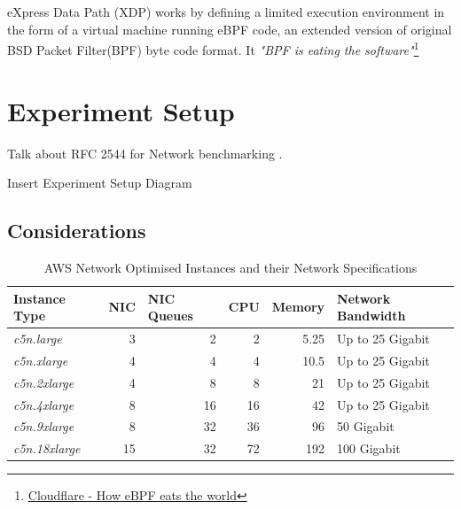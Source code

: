 \documentclass[12pt,titlepage]{article}
\begin{document}
eXpress Data Path (XDP) works by defining a limited execution environment in the form of a virtual machine running eBPF code, an extended version of original BSD Packet Filter(BPF) \cite{mccanne_bsd_1993} byte code format.  
It \textit{"BPF is eating the software"}\footnote{\href{https://blog.cloudflare.com/cloudflare-architecture-and-how-bpf-eats-the-world/}{Cloudflare - How eBPF eats the world}} 


\section{Experiment Setup}

Talk about  RFC 2544 \cite{rfc2544} for Network benchmarking .

Insert Experiment Setup Diagram 

\subsection{Considerations}


\begin{table}[]
\begin{tabular}{|l|r|r|r|r|l|}
\hline
\textbf{Instance Type} & \multicolumn{1}{l|}{\textbf{NIC}} & \multicolumn{1}{l|}{\textbf{NIC Queues}} & \multicolumn{1}{l|}{\textbf{CPU}} & \multicolumn{1}{l|}{\textbf{Memory}} & \textbf{Network Bandwidth} \\ \hline
\textit{c5n.large}     & 3                                 & 2                                        & 2                                 & 5.25                                 & Up to 25 Gigabit           \\ \hline
\textit{c5n.xlarge}    & 4                                 & 4                                        & 4                                 & 10.5                                 & Up to 25 Gigabit           \\ \hline
\textit{c5n.2xlarge}   & 4                                 & 8                                        & 8                                 & 21                                   & Up to 25 Gigabit           \\ \hline
\textit{c5n.4xlarge}   & 8                                 & 16                                       & 16                                & 42                                   & Up to 25 Gigabit           \\ \hline
\textit{c5n.9xlarge}   & 8                                 & 32                                       & 36                                & 96                                   & 50 Gigabit                 \\ \hline
\textit{c5n.18xlarge}  & 15                                & 32                                       & 72                                & 192                                  & 100 Gigabit                \\ \hline
\end{tabular}
\caption{AWS Network Optimised Instances and their Network Specifications}
\label{tab:aws-table}
\end{table}
\end{document}
